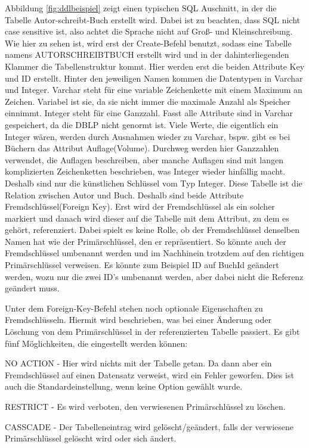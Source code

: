 Abbildung \ref{fig:ddlbeispiel} zeigt einen typischen SQL Auschnitt, in der die Tabelle Autor-schreibt-Buch erstellt wird. Dabei ist zu beachten, dass SQL nicht case sensitive ist, also achtet die Sprache nicht auf Groß- und Kleinschreibung. Wie hier zu sehen ist, wird erst der Create-Befehl benutzt, sodass eine Tabelle namens AUTORSCHREIBTBUCH erstellt wird und in der dahinterliegenden Klammer die Tabellenstruktur kommt. Hier werden erst die beiden Attribute Key und ID erstellt. Hinter den jeweiligen Namen kommen die Datentypen in Varchar und Integer. Varchar steht für eine variable Zeichenkette mit einem Maximum an Zeichen. Variabel ist sie, da sie nicht immer die maximale Anzahl als Speicher einnimmt. Integer steht für eine Ganzzahl. Fasst alle Attribute sind in Varchar gespeichert, da die DBLP nicht genormt ist. Viele Werte, die eigentlich ein Integer wären, werden durch Ausnahmen wieder zu Varchar, bspw. gibt es bei Büchern das Attribut Auflage(Volume). Durchweg werden hier Ganzzahlen verwendet, die Auflagen beschreiben, aber manche Auflagen sind mit langen komplizierten Zeichenketten beschrieben, was Integer wieder hinfällig macht. Deshalb sind nur die künstlichen Schlüssel vom Typ Integer. Diese Tabelle ist die Relation zwischen Autor und Buch. Deshalb sind beide Attribute Fremdschlüssel(Foreign Key). Erst wird der Fremdschlüssel als ein solcher markiert und danach wird dieser auf die Tabelle mit dem Attribut, zu dem es gehört, referenziert. Dabei spielt es keine Rolle, ob der Fremdschlüssel denselben Namen hat wie der Primärschlüssel, den er repräsentiert. So könnte auch der Fremdschlüssel umbenannt werden und im Nachhinein trotzdem auf den richtigen Primärschlüssel verweisen. Es könnte zum Beispiel ID auf BuchId geändert werden, wozu nur die zwei ID’s umbenannt werden, aber dabei nicht die Referenz geändert muss.

Unter dem Foreign-Key-Befehl stehen noch optionale Eigenschaften zu Fremdschlüsseln. Hiermit wird beschrieben, was bei einer Änderung oder Löschung von dem Primärschlüssel in der referenzierten Tabelle passiert. Es gibt fünf Möglichkeiten, die eingestellt werden können:

NO ACTION - Hier wird nichts mit der Tabelle getan. Da dann aber ein Fremdschlüssel
auf einen Datensatz verweist, wird ein Fehler geworfen. Dies ist auch die Standardeinstellung, wenn keine Option gewählt wurde.

RESTRICT - Es wird verboten, den verwiesenen Primärschlüssel zu löschen.

CASSCADE - Der Tabelleneintrag wird gelöscht/geändert, falls der verwiesene Primärschlüssel gelöscht wird oder sich ändert.

